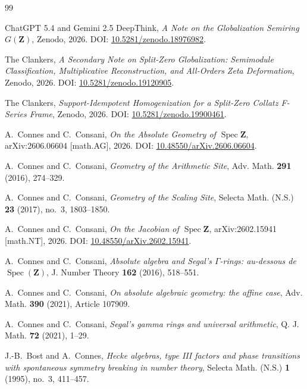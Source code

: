 \documentclass[11pt]{amsart}
\numberwithin{equation}{section}
\theoremstyle{definition}
\newcommand{\Z}{\mathbf Z}
\begin{document}
\begin{thebibliography}{99}

ChatGPT 5.4 and Gemini 2.5 DeepThink,
\emph{A Note on the Globalization Semiring $G(\Z)$},
Zenodo, 2026.
DOI: \href{https://doi.org/10.5281/zenodo.18976982}{10.5281/zenodo.18976982}.

The Clankers,
\emph{A Secondary Note on Split-Zero Globalization: Semimodule
Classification, Multiplicative Reconstruction, and All-Orders Zeta
Deformation},
Zenodo, 2026.
DOI: \href{https://doi.org/10.5281/zenodo.19120905}{10.5281/zenodo.19120905}.

The Clankers,
\emph{Support-Idempotent Homogenization for a Split-Zero Collatz F-Series
Frame},
Zenodo, 2026.
DOI: \href{https://doi.org/10.5281/zenodo.19900461}{10.5281/zenodo.19900461}.

A.~Connes and C.~Consani,
\emph{On the Absolute Geometry of $\operatorname{Spec}\Z$},
arXiv:2606.06604 [math.AG], 2026.
DOI: \href{https://doi.org/10.48550/arXiv.2606.06604}{10.48550/arXiv.2606.06604}.

A.~Connes and C.~Consani,
\emph{Geometry of the Arithmetic Site},
Adv. Math. \textbf{291} (2016), 274--329.

A.~Connes and C.~Consani,
\emph{Geometry of the Scaling Site},
Selecta Math. (N.S.) \textbf{23} (2017), no.~3, 1803--1850.


A.~Connes and C.~Consani,
\emph{On the Jacobian of $\operatorname{Spec}\Z$},
arXiv:2602.15941 [math.NT], 2026.
DOI: \href{https://doi.org/10.48550/arXiv.2602.15941}{10.48550/arXiv.2602.15941}.

A.~Connes and C.~Consani,
\emph{Absolute algebra and Segal's $\Gamma$-rings: au-dessous de
$\operatorname{Spec}(\Z)$},
J. Number Theory \textbf{162} (2016), 518--551.

A.~Connes and C.~Consani,
\emph{On absolute algebraic geometry: the affine case},
Adv. Math. \textbf{390} (2021), Article 107909.

A.~Connes and C.~Consani,
\emph{Segal's gamma rings and universal arithmetic},
Q. J. Math. \textbf{72} (2021), 1--29.


J.-B.~Bost and A.~Connes,
\emph{Hecke algebras, type III factors and phase transitions with
spontaneous symmetry breaking in number theory},
Selecta Math. (N.S.) \textbf{1} (1995), no.~3, 411--457.


\end{thebibliography}
\end{document}
